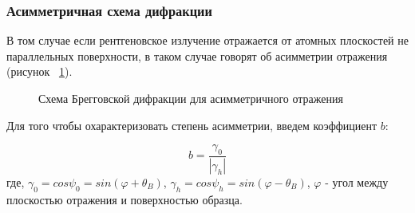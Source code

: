 \subsubsection{Асимметричная схема дифракции}
В том случае если рентгеновское излучение отражается от атомных плоскостей не
 параллельных поверхности, в таком случае говорят об асимметрии отражения (рисунок ~\ref{ris:assymetric_brag}).

\begin{figure}[h]
  \centering
  \hfill
  \caption{Схема Брегговской дифракции для асимметричного отражения}
  \label{ris:assymetric_brag}
\end{figure}

Для того чтобы охарактеризовать степень асимметрии, введем коэффициент $b$:

\begin{equation}
  b = \frac {\gamma_0}{|\gamma_h|}
  \label{eq:koef_b}
 \end{equation}
где, $\gamma_0 = cos \psi_0 = sin ( \varphi + \theta_B)$, $\gamma_h = cos \psi_h = sin ( \varphi - \theta_B)$,
$\varphi$ - угол между плоскостью отражения и поверхностью образца.
